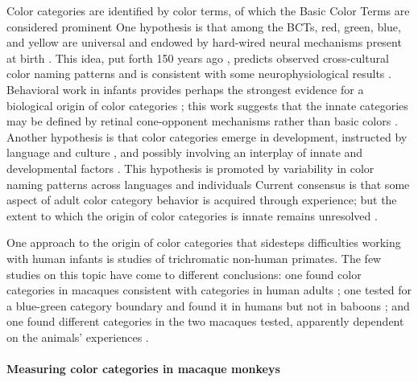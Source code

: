 Color categories are identified by color terms, of which the Basic Color Terms are considered prominent%
One hypothesis is that among the BCTs, red, green, blue, and yellow are universal%
and endowed by hard-wired neural mechanisms present at birth%
. 
This idea, put forth 150 years ago%
, predicts observed cross-cultural color naming patterns %
and is consistent with some neurophysiological results%
. 
Behavioral work in infants provides perhaps the strongest evidence for a biological origin of color categories%
; this work suggests that the innate categories may be defined by retinal cone-opponent mechanisms rather than basic colors%
. 
Another hypothesis is that color categories emerge in development, instructed by language and culture%
, and possibly involving an interplay of innate and developmental factors%
. 
This hypothesis is promoted by variability in color naming patterns across languages and individuals %
Current consensus is that some aspect of adult color category behavior is acquired through experience; but the extent to which the origin of color categories is innate remains unresolved%
. 

One approach to the origin of color categories that sidesteps difficulties working with human infants is studies of trichromatic non-human primates. 
The few studies on this topic have come to different conclusions: one found color categories in macaques consistent with categories in human adults%
; one tested for a blue-green category boundary and found it in humans but not in baboons%
; and one found different categories in the two macaques tested, apparently dependent on the animals’ experiences%
. 


\paragraph{Measuring color categories in macaque monkeys}

